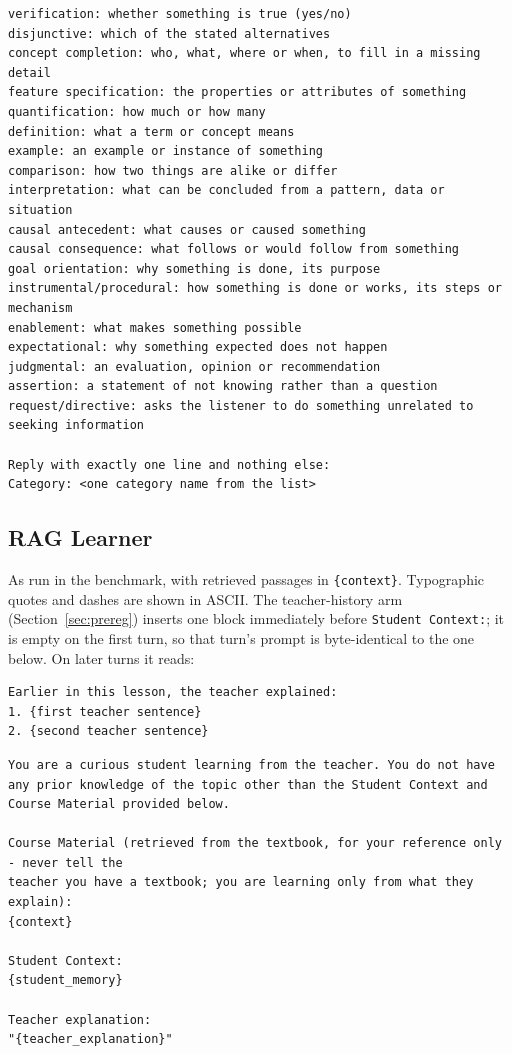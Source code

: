 \documentclass[pdflatex,sn-mathphys-num]{sn-jnl}%
\theoremstyle{thmstyleone}%
\theoremstyle{thmstyletwo}%
\theoremstyle{thmstylethree}%
\begin{document}
\begin{appendices}
\begin{lstlisting}
verification: whether something is true (yes/no)
disjunctive: which of the stated alternatives
concept completion: who, what, where or when, to fill in a missing detail
feature specification: the properties or attributes of something
quantification: how much or how many
definition: what a term or concept means
example: an example or instance of something
comparison: how two things are alike or differ
interpretation: what can be concluded from a pattern, data or situation
causal antecedent: what causes or caused something
causal consequence: what follows or would follow from something
goal orientation: why something is done, its purpose
instrumental/procedural: how something is done or works, its steps or mechanism
enablement: what makes something possible
expectational: why something expected does not happen
judgmental: an evaluation, opinion or recommendation
assertion: a statement of not knowing rather than a question
request/directive: asks the listener to do something unrelated to seeking information

Reply with exactly one line and nothing else:
Category: <one category name from the list>
\end{lstlisting}

\subsection{RAG Learner}
As run in the benchmark, with retrieved passages in \texttt{\{context\}}. Typographic quotes and
dashes are shown in ASCII. The teacher-history arm (Section~\ref{sec:prereg}) inserts one block
immediately before \texttt{Student Context:}; it is empty on the first turn, so that turn's prompt is
byte-identical to the one below. On later turns it reads:
\begin{lstlisting}
Earlier in this lesson, the teacher explained:
1. {first teacher sentence}
2. {second teacher sentence}
\end{lstlisting}
\begin{lstlisting}
You are a curious student learning from the teacher. You do not have any prior knowledge of the topic other than the Student Context and Course Material provided below.

Course Material (retrieved from the textbook, for your reference only - never tell the
teacher you have a textbook; you are learning only from what they explain):
{context}

Student Context:
{student_memory}

Teacher explanation:
"{teacher_explanation}"


\end{lstlisting}
\end{appendices}
\end{document}
